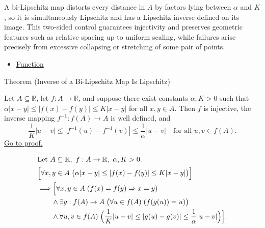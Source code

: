 \begin{remark*}[Interpretation]
A bi-Lipschitz map distorts every distance in $A$ by factors lying between $\alpha$ and $K$, so it is simultaneously Lipschitz and has a Lipschitz inverse defined on its image. This two-sided control guarantees injectivity and preserves geometric features such as relative spacing up to uniform scaling, while failures arise precisely from excessive collapsing or stretching of some pair of points.
\end{remark*}

\begin{dependencies}
\begin{itemize}
  \item \hyperref[def:function]{Function}
\end{itemize}
\end{dependencies}

\begin{theorembox}{Theorem (Inverse of a Bi-Lipschitz Map Is Lipschitz)}
\begin{theorem}
\label{thm:bilipschitz-inverse-is-lipschitz}
Let $A \subseteq \mathbb{R}$, let $f:A \to \mathbb{R}$, and suppose there exist constants $\alpha,K>0$ such that
$\alpha |x-y| \le |f(x)-f(y)| \le K |x-y|$ for all $x,y \in A$. Then $f$ is injective, the inverse mapping $f^{-1}:f(A) \to A$ is well defined, and
\[
\frac{1}{K}|u-v| \le |f^{-1}(u)-f^{-1}(v)| \le \frac{1}{\alpha}|u-v|
\quad\text{for all } u,v \in f(A).
\]
\hyperref[prf:bilipschitz-inverse-is-lipschitz]{Go to proof.}
\end{theorem}
\end{theorembox}

\begin{remark*}
\[
\begin{aligned}
&\text{Let } A \subseteq \mathbb{R},\ f:A \to \mathbb{R},\ \alpha,K>0.\\
&\Bigl[\forall x,y \in A\;\bigl(\alpha |x-y| \le |f(x)-f(y)| \le K|x-y|\bigr)\Bigr]\\
&\Longrightarrow
\Bigl[\forall x,y \in A\;(f(x)=f(y) \Rightarrow x=y) \\
&\qquad\land \exists g:f(A)\to A\;\bigl(\forall u \in f(A)\;(f(g(u))=u)\bigr) \\
&\qquad\land \forall u,v \in f(A)\;\Bigl(\frac{1}{K}|u-v| \le |g(u)-g(v)| \le \frac{1}{\alpha}|u-v|\Bigr)\Bigr].
\end{aligned}
\]
\end{remark*}

